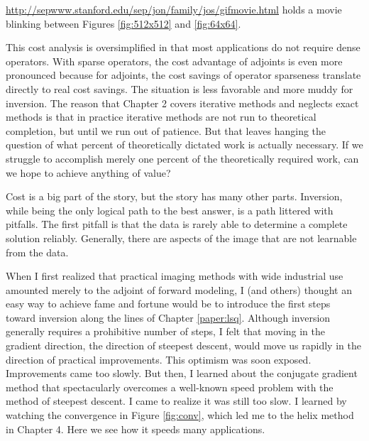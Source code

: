 \par\noindent
\url{http://sepwww.stanford.edu/sep/jon/family/jos/gifmovie.html} holds a movie
blinking between Figures \ref{fig:512x512} and \ref{fig:64x64}.
\par
This cost analysis is oversimplified in that most applications
do not require dense operators.
With sparse operators, the cost advantage of adjoints is even more
pronounced because for adjoints,
the cost savings of operator sparseness translate directly to
real cost savings.
The situation is less favorable and more muddy for inversion.
The reason that Chapter 2 covers iterative methods
and neglects exact methods is that in practice
iterative methods are not run to theoretical completion,
but until we run out of patience.
But that leaves hanging the question of what percent
of theoretically dictated work is actually necessary.
If we struggle to accomplish merely one percent of the theoretically required work,
can we hope to achieve anything of value?

\par
Cost is a big part of the story, but the story has many other parts.
Inversion, while being the only logical path to the best answer,
is a path littered with pitfalls.
The first pitfall is that the data is rarely able to 
determine a complete solution reliably.
Generally, there are aspects of the image that are not learnable
from the data.



When I first realized that practical imaging methods with wide
industrial use amounted merely to the adjoint of forward modeling,
I (and others) thought an easy way to achieve fame and fortune
would be to introduce the first steps toward inversion
along the lines of Chapter \ref{paper:lsq}.
Although inversion generally requires a prohibitive number
of steps, I felt that moving in the gradient direction,
the direction of steepest descent, would move us rapidly
in the direction of practical improvements.
This optimism was soon exposed.
Improvements came too slowly.
But then, I learned about the conjugate gradient method that
spectacularly overcomes a well-known speed problem with the
method of steepest descent.
I came to realize it was still too slow.
I learned by watching the convergence in Figure
\ref{fig:conv},
which led me to the helix method in Chapter 4.
Here we see how it speeds many applications.

